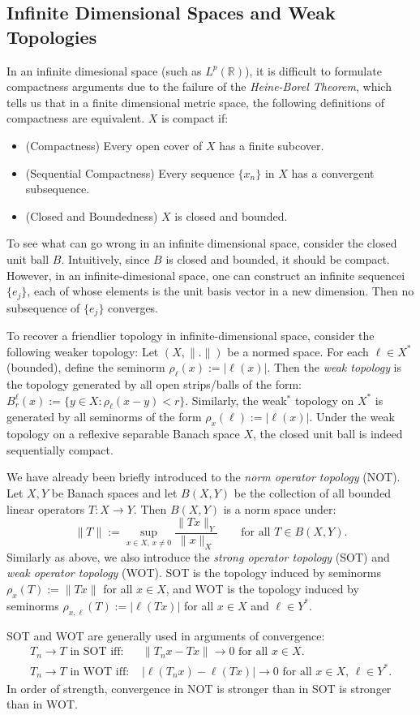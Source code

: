 \documentclass[12pt]{article}
\begin{document}
\subsection*{Infinite Dimensional Spaces and Weak Topologies}

In an infinite dimesional space (such as $L^p(\mathbb{R})$), it is
difficult to formulate compactness arguments due to the failure of
the {\it Heine-Borel Theorem}, which tells us that
in a finite dimensional metric space, 
the following definitions of compactness are equivalent.
$X$ is compact if:
\begin{itemize}
\item (Compactness) Every open cover of $X$ has a finite subcover.
\item (Sequential Compactness) Every sequence $\{x_n\}$ in $X$ has a convergent 
subsequence.
\item (Closed and Boundedness) $X$ is closed and bounded.
\end{itemize}

To see what can go wrong in an infinite dimensional space, consider the 
closed unit ball $B$.
Intuitively, since $B$ is closed and bounded, it should be compact.
However, in an infinite-dimesional space, one can construct an infinite
sequencei $\{e_j\}$, each of whose elements is the unit basis vector in a new 
dimension.
Then no subsequence of $\{e_j\}$ converges.

To recover a friendlier topology in infinite-dimensional space, consider
the following weaker topology:
Let $(X,\|.\|)$ be a normed space.
For each $\ell \in X^*$ (bounded), define the seminorm 
$\rho_\ell(x) := |\ell(x)|$.
Then the {\it weak topology} is the topology generated by all open
strips/balls of the form: $B_r^\ell(x):=\{y\in X: \rho_\ell(x-y) < r\}$.
Similarly, the weak$^*$ topology on $X^*$ is generated by all seminorms
of the form $\rho_x(\ell) := |\ell(x)|$.
Under the weak topology on a reflexive separable Banach space $X$,
the closed unit ball is indeed sequentially compact.

We have already been briefly introduced to the {\it norm operator topology} 
(NOT).
Let $X,Y$ be Banach spaces and let $B(X,Y)$ be the collection of all 
bounded linear operators $T : X \rightarrow Y$.
Then $B(X,Y)$ is a norm space under:
$$
\|T\| := \sup_{x\in X\text{, }x\neq 0}\frac{\|Tx\|_Y}{\|x\|_X}
\qquad\text{for all $T\in B(X,Y)$}.
$$
Similarly as above, we also introduce the {\it strong operator topology}
(SOT) and {\it weak operator topology} (WOT).
SOT is the topology induced by seminorms $\rho_x(T) := \|Tx\|$ for all
$x\in X$,
and WOT is the topology induced by seminorms 
$\rho_{x,\ell}(T) := |\ell(Tx)|$ for all $x\in X$ and $\ell \in Y^*$.

SOT and WOT are generally used in arguments of convergence:
\begin{align*}
T_n \rightarrow T \text{ in SOT iff: }& \|T_n x - Tx\| \rightarrow 0
\text{ for all $x \in X$.}\\
T_n \rightarrow T \text{ in WOT iff: }& |\ell(T_n x) - \ell(Tx)| \rightarrow 0
\text{ for all $x \in X$, $\ell\in Y^*$.}
\end{align*}
In order of strength, convergence in NOT is stronger than in SOT is stronger 
than in WOT.
\end{document}
